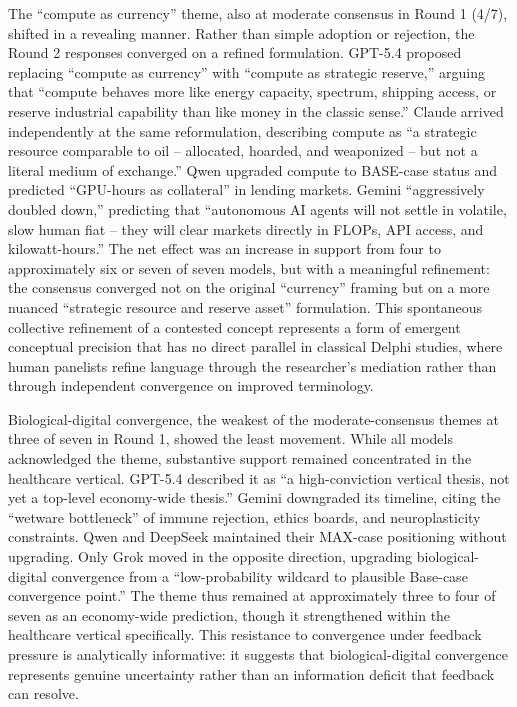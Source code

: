 \documentclass[preprint,review,12pt]{elsarticle}
\begin{document}
The ``compute as currency'' theme, also at moderate consensus in Round 1 (4/7), shifted in a revealing manner. Rather than simple adoption or rejection, the Round 2 responses converged on a refined formulation. GPT-5.4 proposed replacing ``compute as currency'' with ``compute as strategic reserve,'' arguing that ``compute behaves more like energy capacity, spectrum, shipping access, or reserve industrial capability than like money in the classic sense.'' Claude arrived independently at the same reformulation, describing compute as ``a strategic resource comparable to oil -- allocated, hoarded, and weaponized -- but not a literal medium of exchange.'' Qwen upgraded compute to BASE-case status and predicted ``GPU-hours as collateral'' in lending markets. Gemini ``aggressively doubled down,'' predicting that ``autonomous AI agents will not settle in volatile, slow human fiat -- they will clear markets directly in FLOPs, API access, and kilowatt-hours.'' The net effect was an increase in support from four to approximately six or seven of seven models, but with a meaningful refinement: the consensus converged not on the original ``currency'' framing but on a more nuanced ``strategic resource and reserve asset'' formulation. This spontaneous collective refinement of a contested concept represents a form of emergent conceptual precision that has no direct parallel in classical Delphi studies, where human panelists refine language through the researcher's mediation rather than through independent convergence on improved terminology.

Biological-digital convergence, the weakest of the moderate-consensus themes at three of seven in Round 1, showed the least movement. While all models acknowledged the theme, substantive support remained concentrated in the healthcare vertical. GPT-5.4 described it as ``a high-conviction vertical thesis, not yet a top-level economy-wide thesis.'' Gemini downgraded its timeline, citing the ``wetware bottleneck'' of immune rejection, ethics boards, and neuroplasticity constraints. Qwen and DeepSeek maintained their MAX-case positioning without upgrading. Only Grok moved in the opposite direction, upgrading biological-digital convergence from a ``low-probability wildcard to plausible Base-case convergence point.'' The theme thus remained at approximately three to four of seven as an economy-wide prediction, though it strengthened within the healthcare vertical specifically. This resistance to convergence under feedback pressure is analytically informative: it suggests that biological-digital convergence represents genuine uncertainty rather than an information deficit that feedback can resolve.
\end{document}
